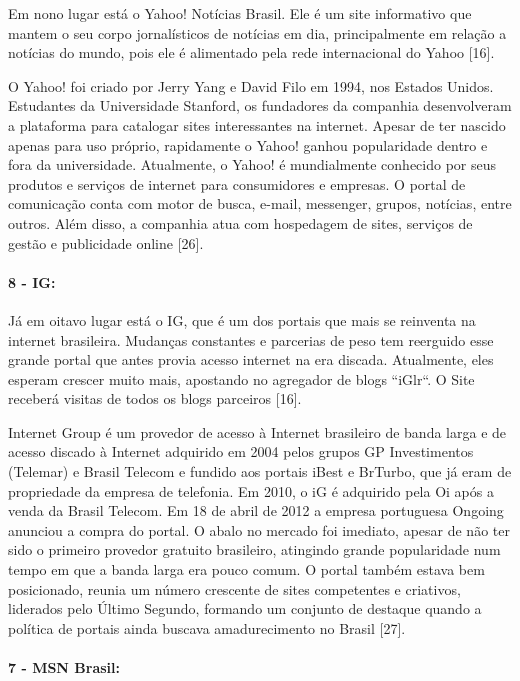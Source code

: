 \documentclass[a4paper]{article}
\begin{document}
\begin{titlepage}
Em nono lugar está o Yahoo! Notícias Brasil. Ele é um site informativo que mantem o seu corpo jornalísticos de notícias em dia, principalmente em relação a notícias do mundo, pois ele é alimentado pela rede internacional do Yahoo [16].

O Yahoo! foi criado por Jerry Yang e David Filo em 1994, nos Estados Unidos. Estudantes da Universidade Stanford, os fundadores da companhia desenvolveram a plataforma para catalogar sites interessantes na internet. Apesar de ter nascido apenas para uso próprio, rapidamente o Yahoo! ganhou popularidade dentro e fora da universidade. Atualmente, o Yahoo! é mundialmente conhecido por seus produtos e serviços de internet para consumidores e empresas. O portal de comunicação conta com motor de busca, e-mail, messenger, grupos, notícias, entre outros. Além disso, a companhia atua com hospedagem de sites, serviços de gestão e publicidade online [26].

\paragraph{8 - IG: }

Já em oitavo lugar está o IG, que é um dos portais que mais se reinventa na internet brasileira. Mudanças constantes e parcerias de peso tem reerguido esse grande portal que antes provia acesso internet na era discada. Atualmente, eles esperam crescer muito mais, apostando no agregador de blogs “iGlr“. O Site receberá visitas de todos os blogs parceiros [16].

Internet Group é um provedor de acesso à Internet brasileiro de banda larga e de acesso discado à Internet adquirido em 2004  pelos grupos GP Investimentos (Telemar) e Brasil Telecom e fundido aos portais iBest e BrTurbo, que já eram de propriedade da empresa de telefonia. Em 2010, o iG é adquirido pela Oi após a venda da Brasil Telecom. Em 18 de abril de 2012 a empresa portuguesa Ongoing anunciou a compra do portal. O abalo no mercado foi imediato, apesar de não ter sido o primeiro provedor gratuito brasileiro, atingindo grande popularidade num tempo em que a banda larga era pouco comum. O portal também estava bem posicionado, reunia um número crescente de sites competentes e criativos, liderados pelo Último Segundo, formando um conjunto de destaque quando a política de portais ainda buscava amadurecimento no Brasil [27].

\paragraph{7 - MSN Brasil: }


\end{titlepage}
\end{document}
